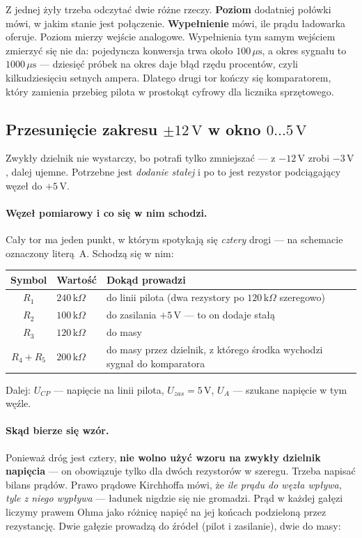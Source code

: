 \documentclass[a4paper,11pt]{article}
\newcommand{\kohm}{\,\mathrm{k}\Omega}
\newcommand{\volt}{\,\mathrm{V}}
\newcommand{\us}{\,\mu\mathrm{s}}
\begin{document}
Z jednej żyły trzeba odczytać dwie różne rzeczy. \textbf{Poziom} dodatniej połówki
mówi, w jakim stanie jest połączenie. \textbf{Wypełnienie} mówi, ile prądu
ładowarka oferuje. Poziom mierzy wejście analogowe. Wypełnienia tym samym wejściem
zmierzyć się nie da: pojedyncza konwersja trwa około $100\us$, a okres sygnału to
$1000\us$ --- dziesięć próbek na okres daje błąd rzędu procentów, czyli
kilkudziesięciu setnych ampera. Dlatego drugi tor kończy się komparatorem, który
zamienia przebieg pilota w prostokąt cyfrowy dla licznika sprzętowego.

\subsection{Przesunięcie zakresu \texorpdfstring{$\pm12\volt$}{+/-12 V} w okno
\texorpdfstring{$0\ldots5\volt$}{0...5 V}}

Zwykły dzielnik nie wystarczy, bo potrafi tylko zmniejszać --- z $-12\volt$ zrobi
$-3\volt$, dalej ujemne. Potrzebne jest \emph{dodanie stałej} i po to jest rezystor
podciągający węzeł do $+5\volt$.

\paragraph{Węzeł pomiarowy i co się w nim schodzi.} Cały tor ma jeden punkt,
w którym spotykają się \emph{cztery} drogi --- na schemacie oznaczony literą~A.
Schodzą się w nim:

\begin{center}
\begin{tabular}{clp{7.4cm}}
\toprule
Symbol & Wartość & Dokąd prowadzi \\
\midrule
$R_1$ & $240\kohm$ & do linii pilota (dwa rezystory po $120\kohm$ szeregowo) \\
$R_2$ & $100\kohm$ & do zasilania $+5\volt$ --- to on dodaje stałą \\
$R_3$ & $120\kohm$ & do masy \\
$R_4+R_5$ & $200\kohm$ & do masy przez dzielnik, z którego środka wychodzi sygnał
  do komparatora \\
\bottomrule
\end{tabular}
\end{center}

Dalej: $U_{CP}$ --- napięcie na linii pilota, $U_{zas}=5\volt$, $U_A$ --- szukane
napięcie w tym węźle.

\paragraph{Skąd bierze się wzór.} Ponieważ dróg jest cztery, \textbf{nie wolno użyć
wzoru na zwykły dzielnik napięcia} --- on obowiązuje tylko dla dwóch rezystorów
w szeregu. Trzeba napisać bilans prądów. Prawo prądowe Kirchhoffa mówi, że
\emph{ile prądu do węzła wpływa, tyle z niego wypływa} --- ładunek nigdzie się nie
gromadzi. Prąd w każdej gałęzi liczymy prawem Ohma jako różnicę napięć na jej
końcach podzieloną przez rezystancję. Dwie gałęzie prowadzą do źródeł (pilot
i zasilanie), dwie do masy:
\end{document}
